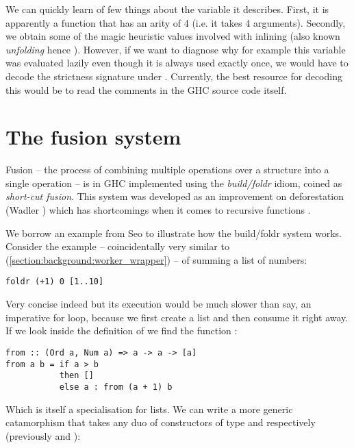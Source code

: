 We can quickly learn of few things about the variable it describes. First,  it is apparently a function that has
an arity of 4 (i.e. it takes 4 arguments). Secondly, we obtain some of the magic heuristic values involved with inlining
(also known \textit{unfolding} hence ). However, if we want to diagnose why for example this variable was evaluated
lazily even though it is always used exactly once, we would have to decode the strictness signature under .
Currently, the best resource for decoding this would be to read the comments in the GHC source code itself.

\section{The fusion system}
\label{section:background:fusion}

Fusion -- the process of combining multiple operations over a structure into a single operation -- is in GHC
implemented using the \textit{build/foldr} idiom, coined as \textit{short-cut fusion}. This system was developed as an improvement on deforestation 
(Wadler \cite{WADLER1990231}) which has shortcomings when it comes to recursive functions \cite{shortcut_fusion}.

We borrow an example from Seo \cite{shortcut_fusion_blog} to illustrate how the build/foldr system works. Consider
the example -- coincidentally very similar to  (\cref{section:background:worker_wrapper}) -- of
summing a list of numbers:

\begin{listing}[H]
\begin{verbatim}
foldr (+1) 0 [1..10]
\end{verbatim}
\end{listing}

Very concise indeed but its execution would be much slower than say, an imperative for loop, because we first create
a list and then consume it right away. If we look inside the definition of \mono{[1..10]} we find the function :

\begin{listing}[H]
\begin{verbatim}
from :: (Ord a, Num a) => a -> a -> [a]
from a b = if a > b
           then []
           else a : from (a + 1) b
\end{verbatim}
\end{listing}

Which is itself a specialisation for lists. We can write a more generic catamorphism that takes any duo of constructors
of type  and  respectively (previously \mono{:} and \mono{[]}):

